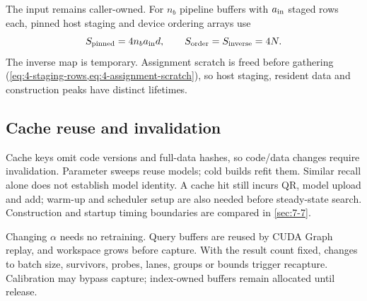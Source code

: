 The input remains caller-owned. For $n_b$ pipeline buffers with
$a_{\rm in}$ staged rows each, pinned host staging and device ordering
arrays use
\[
 S_{\rm pinned}=4n_ba_{\rm in}d,\qquad
 S_{\rm order}=S_{\rm inverse}=4N.
\]
The inverse map is temporary. Assignment scratch is freed before
gathering (\cref{eq:4-staging-rows,eq:4-assignment-scratch}), so host
staging, resident data and construction peaks have distinct lifetimes.

\subsection{Cache reuse and invalidation}

Cache keys omit code versions and full-data hashes, so code/data changes
require invalidation. Parameter sweeps reuse models; cold builds refit
them. Similar recall alone does not establish model identity. A cache
hit still incurs QR, model upload and add; warm-up and scheduler setup
are also needed before steady-state search. Construction and startup
timing boundaries are compared in \cref{sec:7-7}.

Changing $\alpha$ needs no retraining. Query buffers are reused by CUDA
Graph replay, and workspace grows before capture. With the result count
fixed, changes to batch size, survivors, probes, lanes, groups or bounds
trigger recapture. Calibration may bypass capture; index-owned buffers
remain allocated until release.
